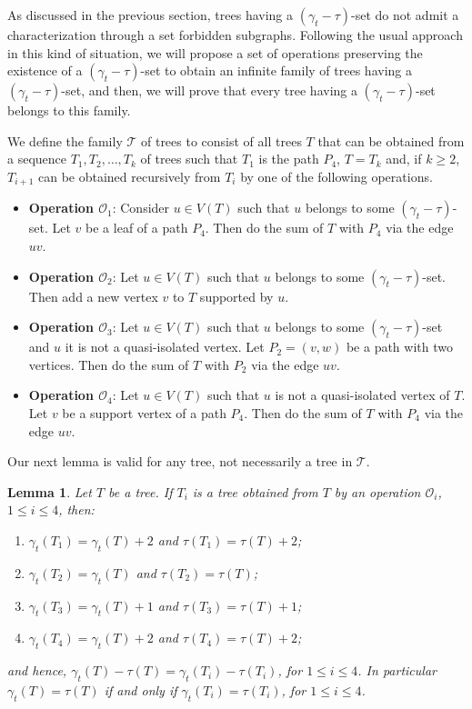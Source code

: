 \documentclass[12pt]{article}%
\newtheorem{lemma}[theorem]{Lemma}
\theoremstyle{definition}
\newcommand{\gtt}{$(\gamma_t - \tau)$}
\begin{document}
As discussed in the previous section, trees having a \gtt-set
do not admit a characterization through a set forbidden
subgraphs.   Following the usual approach in this kind of
situation, we will propose a set of operations preserving the
existence of a \gtt-set to obtain an infinite family of trees having
a \gtt-set, and then, we will prove that every tree having a \gtt-set
belongs to this family.

We define the family $\mathcal{T}$ of trees to consist of all trees
$T$ that can be obtained from a sequence $T_1, T_2, \dots, T_k$
of trees such that $T_1$ is the path $P_4$, $T=T_k$ and, if $k \ge
2$, $T_{i+1}$ can be obtained recursively from $T_i$ by one of
the following operations.   



\begin{itemize}
	\item {\bf Operation $\mathcal{O}_1$}:  Consider $u\in V(T)$
		such that $u$ belongs to some \gtt-set. Let $v$ be a
		leaf of a path $P_4$. Then do the sum of $T$ with $P_4$
		via the edge $uv$.

	\item {\bf Operation $\mathcal{O}_2$}:   Let $u\in V(T)$ such
		that $u$ belongs to some \gtt-set. Then add a new vertex
		$v$ to $T$ supported by $u$.  
	
	\item {\bf Operation $\mathcal{O}_3$}:   Let $u\in V(T)$ such
		that $u$ belongs to some \gtt-set and $u$ it is not a
		quasi-isolated vertex. Let $P_2=(v,w)$ be a path with
		two vertices.  Then do the sum of $T$ with $P_2$ via
		the edge $uv$.
		 
	\item {\bf Operation $\mathcal{O}_4$}:   Let $u\in V(T)$ such
		that $u$ is not a quasi-isolated vertex of $T$. Let $v$ be
		a support vertex of a path $P_4$. Then do the sum of $T$
		with $P_4$ via the edge $uv$. 
\end{itemize}

Our next lemma is valid for any tree, not necessarily a tree in
$\mathcal{T}$.

\begin{lemma} \label{O_i}
Let $T$ be a tree.   If $T_i$ is a tree obtained from $T$ by an
operation $\mathcal{O}_i$, $1 \le i \le 4$, then:
\begin{enumerate}
	\item $\gamma_t (T_1) = \gamma_t (T) + 2$
		and $\tau (T_1) = \tau (T) + 2$;
	
	\item $\gamma_t (T_2) = \gamma_t (T)$ and
		$\tau (T_2) = \tau (T)$;

	\item $\gamma_t (T_3) = \gamma_t (T) + 1$
		and $\tau (T_3) = \tau (T) + 1$;
	
	\item $\gamma_t (T_4) = \gamma_t (T) + 2$
		and $\tau (T_4) = \tau (T) + 2$;
\end{enumerate}
and hence,  $\gamma_t (T) - \tau (T) = \gamma_t (T_i) - \tau (T_i)$,
for $1 \le i \le 4$.   In particular $\gamma_t (T) = \tau (T)$ if and only
if $\gamma_t (T_i) = \tau (T_i)$, for $1 \le i \le 4$.   
\end{lemma}
\end{document}
